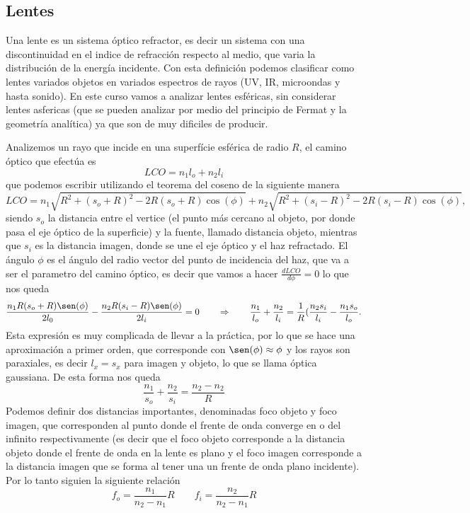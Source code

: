 \documentclass[a4paper,spanish]{article}
\numberwithin{equation}{section}
\begin{document}
	\subsection{Lentes}
		Una lente es un sistema \'optico refractor, es decir un sistema con una discontinuidad en el indice de refracci\'on respecto al medio, que varia la distribuci\'on de la energ\'ia incidente. Con esta definici\'on podemos clasificar como lentes variados objetos en variados espectros de rayos (UV, IR, microondas y hasta sonido). En este curso vamos a analizar lentes esf\'ericas, sin considerar lentes asfericas (que se pueden analizar por medio del principio de Fermat y la geometr\'ia anal\'itica) ya que son de muy dificiles de producir.
		
		Analizemos un rayo que incide en una superf\'icie esf\'erica de radio $R$, el camino \'optico que efect\'ua es \[LCO = n_1 l_o + n_2 l_i\] que podemos escribir utilizando el teorema del coseno de la siguiente manera \[LCO = n_1\sqrt{R^2 + (s_o + R)^2 - 2 R (s_o + R) \cos(\phi)} + n_2\sqrt{R^2 + (s_i - R)^2 - 2 R (s_i - R) \cos(\phi)},\] siendo $s_o$ la distancia entre el vertice (el punto m\'as cercano al objeto, por donde pasa el eje \'optico de la superficie) y la fuente, llamado distancia objeto, mientras que $s_i$ es la distancia imagen, donde se une el eje \'optico y el haz refractado. El \'angulo $\phi$ es el \'angulo del radio vector del punto de incidencia del haz, que va a ser el parametro del camino \'optico, es decir que vamos a hacer $\frac{d LCO}{d\phi} = 0$ lo que nos queda 
		\[\frac{n_1 R (s_o + R) \sen(\phi)}{2 l_0} - \frac{n_2 R (s_i - R) \sen(\phi)}{2 l_i} = 0 \qquad \Rightarrow \qquad \frac{n_1}{l_o} + \frac{n_2}{l_i} = \frac{1}{R}(\frac{n_2 s_i}{l_i} - \frac{n_1 s_o}{l_o}.\] 
		Esta expresi\'on es muy complicada de llevar a la pr\'actica, por lo que se hace una aproximaci\'on a primer orden, que corresponde con $\sen(\phi) \approx \phi$ y los rayos son paraxiales, es decir $l_x = s_x$ para imagen y objeto, lo que se llama \'optica gaussiana. De esta forma nos queda
		\begin{equation}
			\frac{n_1}{s_o} + \frac{n_2}{s_i} = \frac{n_2 - n_2}{R}
			\label{eq:lentes_esferica}
		\end{equation}
		Podemos definir dos distancias importantes, denominadas foco objeto y foco imagen, que corresponden al punto donde el frente de onda converge en o del infinito respectivamente (es decir que el foco objeto corresponde a la distancia objeto donde el frente de onda en la lente es plano y el foco imagen corresponde a la distancia imagen que se forma al tener una un frente de onda plano incidente). Por lo tanto siguien la siguiente relaci\'on 
		\begin{equation}
			 f_o = \frac{n_1}{n_2 - n_1} R \qquad f_i = \frac{n_2}{n_2 - n_1} R
			 \label{eq:lentes_foco_objeto_imagen}
		\end{equation}
		
\end{document}
